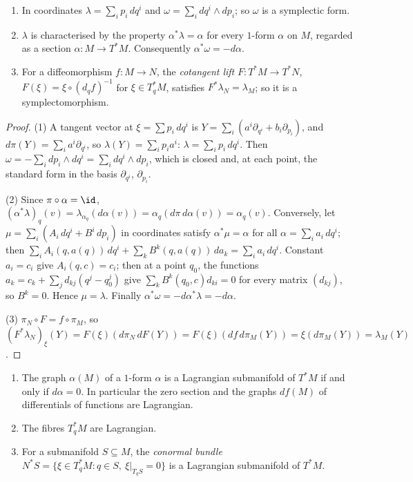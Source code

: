 \begin{proposition}\label{symplectic-geometry:proposition-tautological}
\begin{enumerate}
\item In coordinates $\lambda = \sum_ip_i\,dq^i$ and $\omega = \sum_idq^i \wedge dp_i$; so $\omega$ is a symplectic form.
\item $\lambda$ is characterised by the property $\alpha^*\lambda = \alpha$ for every $1$-form $\alpha$ on $M$, regarded as a section $\alpha \colon M \to T^*M$. Consequently $\alpha^*\omega = -d\alpha$.
\item For a diffeomorphism $f \colon M \to N$, the \emph{cotangent lift} $F \colon T^*M \to T^*N$, $F(\xi) = \xi \circ (d_qf)^{-1}$ for $\xi \in T^*_qM$, satisfies $F^*\lambda_N = \lambda_M$; so it is a
symplectomorphism.
\end{enumerate}
\end{proposition}

\begin{proof}
(1) A tangent vector at $\xi = \sum p_i\,dq^i$ is $Y = \sum_i(a^i\partial_{q^i} + b_i\partial_{p_i})$, and $d\pi(Y) = \sum_ia^i\partial_{q^i}$, so $\lambda(Y) = \sum_ip_ia^i$: $\lambda = \sum_ip_i\,dq^i$. Then
$\omega = -\sum_idp_i \wedge dq^i = \sum_idq^i \wedge dp_i$, which is closed and, at each point, the standard form in the basis $\partial_{q^i}$, $\partial_{p_i}$.

(2) Since $\pi \circ \alpha = \id$, $(\alpha^*\lambda)_q(v) = \lambda_{\alpha_q}(d\alpha(v)) = \alpha_q(d\pi\,d\alpha(v)) = \alpha_q(v)$. Conversely, let $\mu = \sum_i(A_i\,dq^i + B^i\,dp_i)$ in coordinates
satisfy $\alpha^*\mu = \alpha$ for all $\alpha = \sum_ia_i\,dq^i$; then $\sum_iA_i(q, a(q))\,dq^i + \sum_kB^k(q, a(q))\,da_k = \sum_ia_i\,dq^i$. Constant $a_i = c_i$ give $A_i(q, c) = c_i$; then at a point $q_0$,
the functions $a_k = c_k + \sum_jd_{kj}(q^j - q_0^j)$ give $\sum_kB^k(q_0, c)d_{ki} = 0$ for every matrix $(d_{kj})$, so $B^k = 0$. Hence $\mu = \lambda$. Finally $\alpha^*\omega = -d\alpha^*\lambda = -d\alpha$.

(3) $\pi_N \circ F = f \circ \pi_M$, so $(F^*\lambda_N)_\xi(Y) = F(\xi)(d\pi_N\,dF(Y)) = F(\xi)(df\,d\pi_M(Y)) = \xi(d\pi_M(Y)) = \lambda_M(Y)$.
\end{proof}

\begin{corollary}\label{symplectic-geometry:corollary-lagrangian-graphs}
\begin{enumerate}
\item The graph $\alpha(M)$ of a $1$-form $\alpha$ is a Lagrangian submanifold of $T^*M$ if and only if $d\alpha = 0$. In particular the zero section and the graphs $df(M)$ of differentials of functions are
Lagrangian.
\item The fibres $T^*_qM$ are Lagrangian.
\item For a submanifold $S \subseteq M$, the \emph{conormal bundle} $N^*S = \{\xi \in T^*_qM : q \in S, \ \xi|_{T_qS} = 0\}$ is a Lagrangian submanifold of $T^*M$.
\end{enumerate}
\end{corollary}

